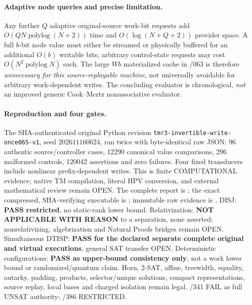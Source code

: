\documentclass[11pt]{article}
\begin{document}
\paragraph{Adaptive node queries and precise limitation.}
Any further $Q$ adaptive original-source work-bit requests add
$O(QN\operatorname{polylog}(N+2))$ time and
$O(\log(N+Q+2))$ provider space. A full $b$-bit node
value must either be streamed or physically buffered for an
additional $O(b)$ writable bits; arbitrary control-state
requests may cost $O(N^2\operatorname{polylog}N)$ each.
The large $Wb$ materialized cache in /063 is therefore
\emph{unnecessary for this source-replayable machine},
not universally avoidable for arbitrary work-dependent writes.
The concluding evaluator is chronological, \emph{not} an
improved generic Cook--Mertz nonassociative evaluator.

\paragraph{Reproduction and four gates.}
The SHA-authenticated original Python revision
\texttt{tmr3-invertible-write-once065-v1},
seed $202611160624$, ran twice with byte-identical raw JSON:
96 authentic source/controller cases, 12290 canonical value
comparisons, 296 malformed controls, 120042 assertions and
zero failures. Four fixed transducers include nonlinear
prefix-dependent writes. This is finite COMPUTATIONAL evidence;
native TM compilation, literal HPV conversion, and external
mathematical review remain OPEN.
The complete report is
;
the exact compressed, SHA-verifying executable is
;
immutable raw evidence is
.
DISJ: \textbf{PASS restricted}, no static-rank lower bound.
Relativization: \textbf{NOT APPLICABLE WITH REASON}
to a separation, none asserted; nonrelativizing,
algebrization and Natural Proofs bridges remain OPEN.
Simultaneous DTISP: \textbf{PASS for the declared separate
complete original and virtual executions}, general SAT
transfer OPEN. Deterministic configurations:
\textbf{PASS as upper-bound consistency only}, not
a work lower bound or randomized/quantum claim.
Horn, 2-SAT, affine, treewidth, equality, autarky,
padding, products, selector/unique solutions, compact
representations, source replay, local bases and charged
isolation remain legal. /341 FAIL as full UNSAT authority;
 /386 RESTRICTED.
\end{document}
